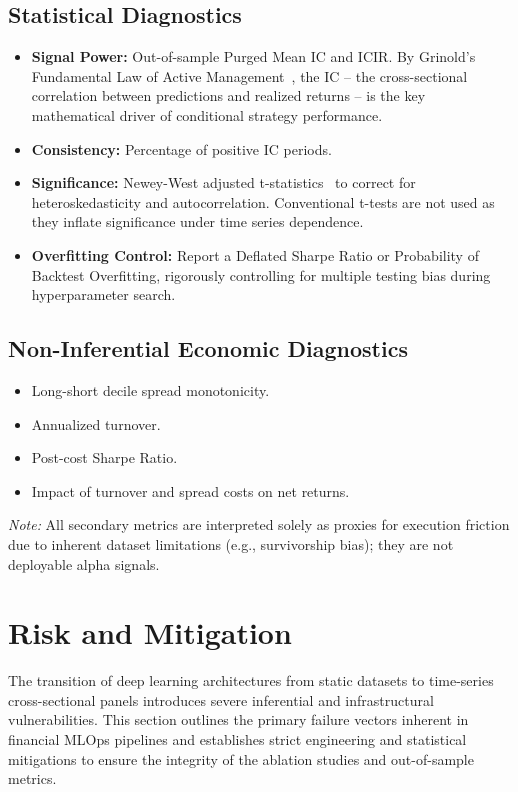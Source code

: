 \subsection*{Statistical Diagnostics}
\begin{itemize}
    \item \textbf{Signal Power:} Out-of-sample Purged Mean \ac{IC} and \ac{ICIR}. By Grinold's Fundamental Law of Active Management~\cite{Grinold1989}, the \acs{IC} -- the cross-sectional correlation between predictions and realized returns -- is the key mathematical driver of conditional strategy performance.
    \item \textbf{Consistency:} Percentage of positive \acs{IC} periods.
    \item \textbf{Significance:} Newey-West adjusted t-statistics~\cite{NeweyWest1987} to correct for heteroskedasticity and autocorrelation. Conventional t-tests are not used as they inflate significance under time series dependence.
    \item \textbf{Overfitting Control:} Report a Deflated Sharpe Ratio or Probability of Backtest Overfitting, rigorously controlling for multiple testing bias during hyperparameter search.
\end{itemize}

\subsection*{Non-Inferential Economic Diagnostics}
\begin{itemize}
    \item Long-short decile spread monotonicity.
    \item Annualized turnover.
    \item Post-cost Sharpe Ratio.
    \item Impact of turnover and spread costs on net returns.
\end{itemize}

\textit{Note:} All secondary metrics are interpreted solely as proxies for execution friction due to inherent dataset limitations (e.g., survivorship bias); they are not deployable alpha signals.

\section{Risk and Mitigation}

The transition of deep learning architectures from static datasets to time-series cross-sectional panels introduces severe inferential and infrastructural vulnerabilities. This section outlines the primary failure vectors inherent in financial \acs{MLOps} pipelines and establishes strict engineering and statistical mitigations to ensure the integrity of the ablation studies and out-of-sample metrics.

